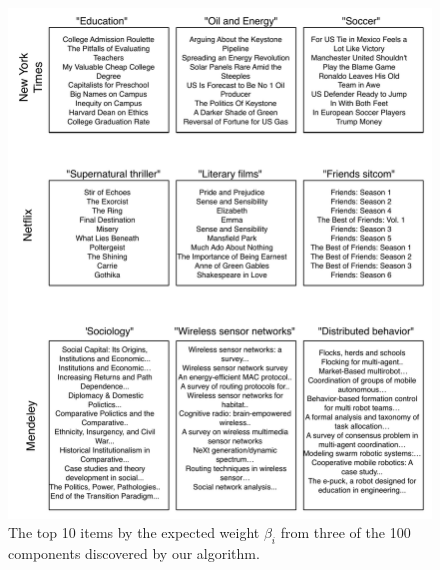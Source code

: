 




\begin{figure}
\centering
\includegraphics[width=\textwidth]{./figures/components.pdf}
\caption{The top 10 items by the expected weight $\beta_i$ from three
  of the 100 components discovered by our algorithm.}
\label{fig:components}
\end{figure}
